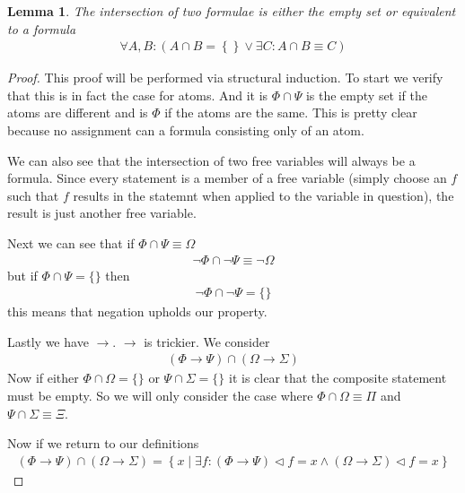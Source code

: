 \documentclass{article}
\newtheorem{lem}{Lemma}
\begin{document}
\begin{lem}
The intersection of two formulae is either the empty set or equivalent to a formula
\begin{align*}
\forall A,B : \left(A \cap B = \left\{\right\} \lor \exists C : A \cap B \equiv C \right)
\end{align*}
\end{lem}
\begin{proof}
This proof will be performed via structural induction.
To start we verify that this is in fact the case for atoms.
And it is $\Phi \cap \Psi$ is the empty set if the atoms are different and is $\Phi$ if the atoms are the same.
This is pretty clear because no assignment can a formula consisting only of an atom.

We can also see that the intersection of two free variables will always be a formula.
Since every statement is a member of a free variable (simply choose an $f$ such that $f$ results in the statemnt when applied to the variable in question),
the result is just another free variable.

Next we can see that if $\Phi \cap \Psi \equiv \Omega$
\begin{align*}
\neg \Phi \cap \neg \Psi \equiv \neg \Omega
\end{align*}
but if $\Phi \cap \Psi = \{\}$ then
\begin{align*}
\neg \Phi \cap \neg \Psi = \{\}
\end{align*}
this means that negation upholds our property.

Lastly we have $\rightarrow$.
$\rightarrow$ is trickier.
We consider
\begin{align*}
(\Phi \rightarrow \Psi) \cap (\Omega \rightarrow \Sigma)
\end{align*}
Now if either $\Phi \cap \Omega = \{\}$ or $\Psi \cap \Sigma = \{\}$ it is clear that the composite statement must be empty.
So we will only consider the case where $\Phi \cap \Omega \equiv \Pi$ and $\Psi \cap \Sigma \equiv \Xi$.

Now if we return to our definitions
\begin{align*}
(\Phi \rightarrow \Psi) \cap (\Omega \rightarrow \Sigma) = \left\{x\mid\exists f:(\Phi \rightarrow \Psi)\lhd f = x \land (\Omega \rightarrow \Sigma) \lhd f = x\right\}
\end{align*}
\end{proof}
\end{document}
